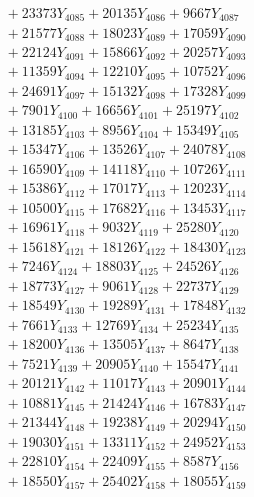 \documentclass[a4paper,10pt]{article}
\begin{document}
{\begin{align}
&\;  + 23373 Y_{4085} + 20135 Y_{4086} + 9667 Y_{4087} \\[0.3ex]
&\;  + 21577 Y_{4088} + 18023 Y_{4089} + 17059 Y_{4090} \\[0.3ex]
&\;  + 22124 Y_{4091} + 15866 Y_{4092} + 20257 Y_{4093} \\[0.3ex]
&\;  + 11359 Y_{4094} + 12210 Y_{4095} + 10752 Y_{4096} \\[0.3ex]
&\;  + 24691 Y_{4097} + 15132 Y_{4098} + 17328 Y_{4099} \\[0.3ex]
&\;  + 7901 Y_{4100} + 16656 Y_{4101} + 25197 Y_{4102} \\[0.3ex]
&\;  + 13185 Y_{4103} + 8956 Y_{4104} + 15349 Y_{4105} \\[0.3ex]
&\;  + 15347 Y_{4106} + 13526 Y_{4107} + 24078 Y_{4108} \\[0.5ex]\allowbreak
&\;  + 16590 Y_{4109} + 14118 Y_{4110} + 10726 Y_{4111} \\[0.3ex]
&\;  + 15386 Y_{4112} + 17017 Y_{4113} + 12023 Y_{4114} \\[0.3ex]
&\;  + 10500 Y_{4115} + 17682 Y_{4116} + 13453 Y_{4117} \\[0.3ex]
&\;  + 16961 Y_{4118} + 9032 Y_{4119} + 25280 Y_{4120} \\[0.3ex]
&\;  + 15618 Y_{4121} + 18126 Y_{4122} + 18430 Y_{4123} \\[0.3ex]
&\;  + 7246 Y_{4124} + 18803 Y_{4125} + 24526 Y_{4126} \\[0.3ex]
&\;  + 18773 Y_{4127} + 9061 Y_{4128} + 22737 Y_{4129} \\[0.3ex]
&\;  + 18549 Y_{4130} + 19289 Y_{4131} + 17848 Y_{4132} \\[0.3ex]
&\;  + 7661 Y_{4133} + 12769 Y_{4134} + 25234 Y_{4135} \\[0.3ex]
&\;  + 18200 Y_{4136} + 13505 Y_{4137} + 8647 Y_{4138} \\[0.5ex]\allowbreak
&\;  + 7521 Y_{4139} + 20905 Y_{4140} + 15547 Y_{4141} \\[0.3ex]
&\;  + 20121 Y_{4142} + 11017 Y_{4143} + 20901 Y_{4144} \\[0.3ex]
&\;  + 10881 Y_{4145} + 21424 Y_{4146} + 16783 Y_{4147} \\[0.3ex]
&\;  + 21344 Y_{4148} + 19238 Y_{4149} + 20294 Y_{4150} \\[0.3ex]
&\;  + 19030 Y_{4151} + 13311 Y_{4152} + 24952 Y_{4153} \\[0.3ex]
&\;  + 22810 Y_{4154} + 22409 Y_{4155} + 8587 Y_{4156} \\[0.3ex]
&\;  + 18550 Y_{4157} + 25402 Y_{4158} + 18055 Y_{4159} \\[0.3ex]

\end{align}}
\end{document}
